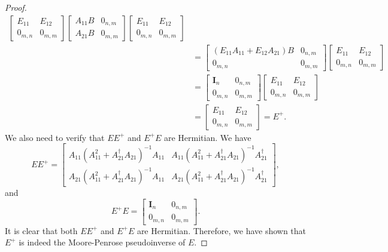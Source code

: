 \documentclass[10pt,a4paper]{amsart}
\begin{document}
\begin{proof}
\begin{align}
\begin{bmatrix}
        E_{11} & E_{12} \\ 
        0_{m,n} & 0_{m,m} 
      \end{bmatrix} 
      \begin{bmatrix} 
        A_{11} B & 0_{n,m} \\ 
        A_{21} B & 0_{m,m} 
      \end{bmatrix} 
      \begin{bmatrix} 
        E_{11} & E_{12} \\ 
        0_{m,n} & 0_{m,m} 
      \end{bmatrix} \nonumber \\
      &= 
      \begin{bmatrix} 
        (E_{11}A_{11}+ E_{12}A_{21})B & 0_{n,m} \\
        0_{m,n} & 0_{m,m} 
      \end{bmatrix} 
      \begin{bmatrix} 
        E_{11} & E_{12} \\ 
        0_{m,n} & 0_{m,m} 
      \end{bmatrix} \nonumber \\
      &= 
      \begin{bmatrix} 
        \mathbf{I}_{n} & 0_{n,m} \\ 
        0_{m,n} & 0_{m,m} 
      \end{bmatrix} 
      \begin{bmatrix} 
        E_{11} & E_{12} \\ 
        0_{m,n} & 0_{m,m} 
      \end{bmatrix} \nonumber \\
      &= 
      \begin{bmatrix}
         E_{11} & E_{12} \\ 
         0_{m,n} & 0_{m,m} 
      \end{bmatrix} = E^{+}.
    \end{align}
    We also need to verify that $EE^{+}$ and $E^{+}E$ are Hermitian. We have
    \begin{equation}
      EE^{+} = \begin{bmatrix} A_{11} \left(A_{11}^2 + A_{21}^{\dagger}A_{21}\right)^{-1} A_{11} & A_{11} \left(A_{11}^2 + A_{21}^{\dagger}A_{21}\right)^{-1} A_{21}^{\dagger}  \\ A_{21} \left(A_{11}^2 + A_{21}^{\dagger}A_{21}\right)^{-1} A_{11}  & A_{21}\left(A_{11}^2 + A_{21}^{\dagger}A_{21}\right)^{-1} A_{21}^{\dagger}  \end{bmatrix},
    \end{equation}
    and 
    \begin{equation}
      E^{+} E = \begin{bmatrix} \mathbf{I}_{n} & 0_{n,m} \\ 0_{m,n} & 0_{m,m} \end{bmatrix}.
    \end{equation}
    It is clear that both $EE^{+}$ and $E^{+}E$ are Hermitian. Therefore, we have shown that $E^{+}$ is indeed the Moore-Penrose pseudoinverse of $E$.
    \end{proof}
\end{document}
